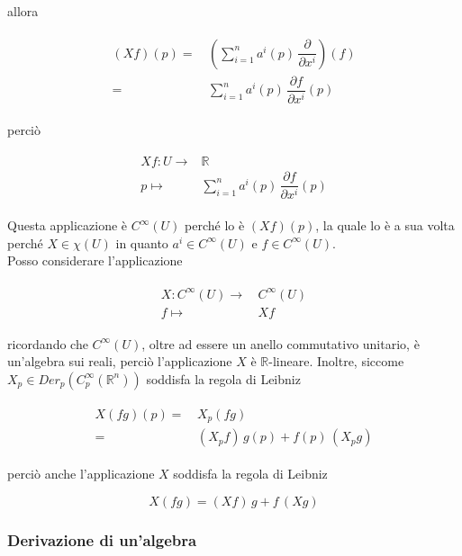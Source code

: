 allora

\begin{align}
	\begin{split}
		(X f) (p) =& \, \left( \sum_{i=1}^{n} a^{i}(p) \, \dfrac{\partial}{\partial x^{i}} \right) (f)\\
		=& \, \sum_{i=1}^{n} a^{i}(p) \, \dfrac{\partial f}{\partial x^{i}} (p)
	\end{split}
\end{align}

perciò

\begin{align}
	\begin{split}
		X f : U \to& \mathbb{R}\\
		p \mapsto& \sum_{i=1}^{n} a^{i}(p) \, \dfrac{\partial f}{\partial x^{i}} (p)
	\end{split}
\end{align}

Questa applicazione è $ C^{\infty}(U) $ perché lo è $ (X f) (p) $, la quale lo è a sua volta perché $ X \in \chi(U) $ in quanto $ a^{i} \in C^{\infty}(U) $ e $ f \in C^{\infty}(U) $.\\
Posso considerare l'applicazione

\begin{align}
	\begin{split}
		X : C^{\infty}(U) \to& \, C^{\infty}(U)\\
		f \mapsto& \, X f
	\end{split}
\end{align}

ricordando che $ C^{\infty}(U) $, oltre ad essere un anello commutativo unitario, è un'algebra sui reali, perciò l'applicazione $ X $ è $ \mathbb{R} $-lineare. Inoltre, siccome $ X_{p} \in Der_{p}(C_{p}^{\infty}(\mathbb{R}^{n})) $ soddisfa la regola di Leibniz

\begin{align}
	\begin{split}
		X (f g) (p) =& \, X_{p} (f g)\\
		=& \, (X_{p} f) \, g(p) + f(p) \, (X_{p} g) 
	\end{split}
\end{align}

perciò anche l'applicazione $ X $ soddisfa la regola di Leibniz

\begin{equation}
	X (f g) = (X f) \, g + f \, (X g)
\end{equation}

\subsubsection{Derivazione di un'algebra}

